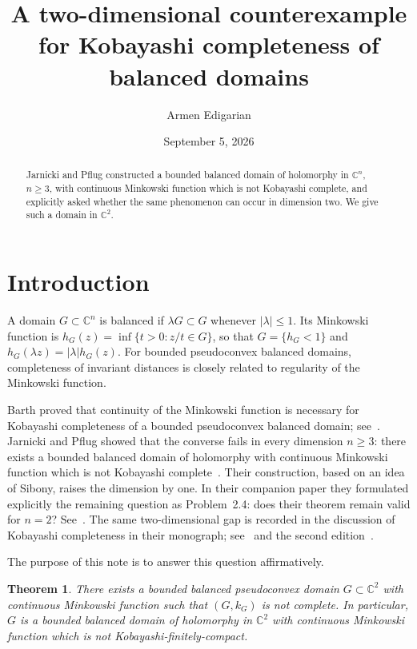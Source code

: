 \documentclass{amsart}
\title[A two-dimensional counterexample]{A two-dimensional counterexample for Kobayashi completeness of balanced domains}
\author{Armen Edigarian}
\date{September 5, 2026}
\newcommand{\C}{\mathbb C}
\newtheorem{theorem}{Theorem}[section]
\theoremstyle{remark}
\begin{document}
\begin{abstract}
Jarnicki and Pflug constructed a bounded balanced domain of holomorphy in $\C^n$, $n\ge 3$, with continuous Minkowski function which is not Kobayashi complete, and explicitly asked whether the same phenomenon can occur in dimension two. We give such a domain in $\C^2$.
\end{abstract}

\maketitle

\section{Introduction}

A domain $G\subset\C^n$ is balanced if $\lambda G\subset G$ whenever $|\lambda|\le 1$. Its Minkowski function is
$h_G(z)=\inf\{t>0:z/t\in G\}$, so that $G=\{h_G<1\}$ and $h_G(\lambda z)=|\lambda|h_G(z)$. For bounded pseudoconvex balanced domains, completeness of invariant distances is closely related to regularity of the Minkowski function.

Barth proved that continuity of the Minkowski function is necessary for Kobayashi completeness of a bounded pseudoconvex balanced domain; see~\cite{Barth}. Jarnicki and Pflug showed that the converse fails in every dimension $n\ge3$: there exists a bounded balanced domain of holomorphy with continuous Minkowski function which is not Kobayashi complete~\cite{JPcounterexample}. Their construction, based on an idea of Sibony, raises the dimension by one. In their companion paper they formulated explicitly the remaining question as Problem~2.4: does their theorem remain valid for $n=2$? See~\cite[Problem~2.4]{JPproduct}. The same two-dimensional gap is recorded in the discussion of Kobayashi completeness in their monograph; see~\cite[Chapter~VII, \S7.5]{JPbook1} and the second edition~\cite[Chapter~14]{JPbook2}.

The purpose of this note is to answer this question affirmatively.

\begin{theorem}\label{thm:main}
There exists a bounded balanced pseudoconvex domain $G\subset\C^2$ with continuous Minkowski function such that $(G,k_G)$ is not complete. In particular, $G$ is a bounded balanced domain of holomorphy in $\C^2$ with continuous Minkowski function which is not Kobayashi-finitely-compact.
\end{theorem}
\end{document}
